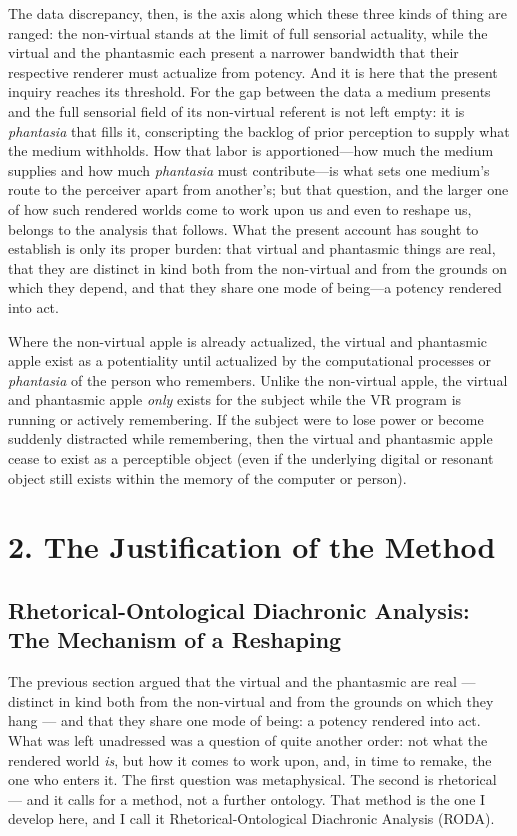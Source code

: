\documentclass{article}
\begin{document}
The data discrepancy, then, is the axis along which these three kinds of thing are ranged: the non-virtual stands at the limit of full sensorial actuality, while the virtual and the phantasmic each present a narrower bandwidth that their respective renderer must actualize from potency. And it is here that the present inquiry reaches its threshold. For the gap between the data a medium presents and the full sensorial field of its non-virtual referent is not left empty: it is \textit{phantasia} that fills it, conscripting the backlog of prior perception to supply what the medium withholds. How that labor is apportioned—how much the medium supplies and how much \textit{phantasia} must contribute—is what sets one medium's route to the perceiver apart from another's; but that question, and the larger one of how such rendered worlds come to work upon us and even to reshape us, belongs to the analysis that follows. What the present account has sought to establish is only its proper burden: that virtual and phantasmic things are real, that they are distinct in kind both from the non-virtual and from the grounds on which they depend, and that they share one mode of being—a potency rendered into act.

Where the non-virtual apple is already actualized, the virtual and phantasmic apple exist as a potentiality until actualized by the computational processes or \textit{phantasia} of the person who remembers. Unlike the non-virtual apple, the virtual and phantasmic apple \textit{only} exists for the subject while the VR program is running or actively remembering. If the subject were to lose power or become suddenly distracted while remembering, then the virtual and phantasmic apple cease to exist as a perceptible object (even if the underlying digital or resonant object still exists within the memory of the computer or person).

\bigskip

\section*{2. The Justification of the Method}

\subsection*{Rhetorical-Ontological Diachronic Analysis: The Mechanism of a Reshaping}

The previous section argued that the virtual and the phantasmic are real — distinct in kind both from the non-virtual and from the grounds on which they hang — and that they share one mode of being: a potency rendered into act. What was left unadressed was a question of quite another order: not what the rendered world \textit{is}, but how it comes to work upon, and, in time to remake, the one who enters it. The first question was metaphysical. The second is rhetorical — and it calls for a method, not a further ontology. That method is the one I develop here, and I call it Rhetorical-Ontological Diachronic Analysis (RODA).
\end{document}
